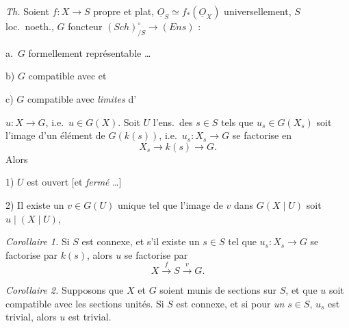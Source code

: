 \documentclass[11pt,a4paper]{article}
\begin{document}
\emph{Th.} Soient $f \colon X \to S$ propre et plat, $\underline{O}_S \simeq f_*(\underline{O}_X)$ universellement, $S$ loc.\ noeth., $G$ foncteur $(\mathit{Sch})_{/S}^{\circ} \to (\mathit{Ens})$ :

a.\ $G$ formellement représentable \ldots


b) $G$ compatible avec  \ill{} \ill{} \ill{}  et  

c) $G$ compatible avec \emph{limites} d' \struck{\ill{} \ill{}}


$u \colon X \to G$, i.e.\ $u \in G(X)$. Soit $U$ l'ens.\ des $s \in S$ tels que $u_s \in G(X_s)$ soit l'image d'un élément de $G(k(s))$, i.e.\ $u_s \colon X_s \to G$ se factorise en
\[
  X_s \to k(s) \to G .
\]
Alors

1) $U$ est ouvert [et \emph{fermé}  \ill{} \ill{} \ldots {}]

2) Il existe un  $v \in G(U)$ unique tel que l'image de $v$ dans $G(X \mid U)$ soit $u \mid (X \mid U)$, 

\emph{Corollaire 1.} Si $S$ est connexe, et s'il existe un $s \in S$ tel que $u_s \colon X_s \to G$ se factorise par $k(s)$, alors $u$ se factorise par
\[
  X \xrightarrow{\ f\ } S \xrightarrow{\ v\ } G .
\]

\emph{Corollaire 2.} Supposons que $X$ et $G$ soient munis de sections sur $S$, et que $u$ soit compatible avec les sections unités. Si $S$ est connexe, et si pour \emph{un} $s \in S$, $u_s$ est trivial, alors $u$ est trivial.
\end{document}
